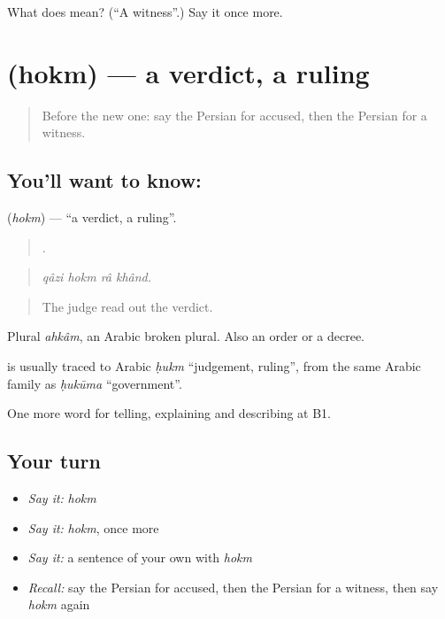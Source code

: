\begin{tcolorbox}[breakable,colback=teal!4,colframe=teal!35!black,title={Before you move on}]
What does  mean? (\textquotedblleft{}A witness\textquotedblright{}.) Say it once more.
\end{tcolorbox}
\section[\texorpdfstring{\fa{حکم} (hokm)}{حکم (hokm)}]{ (hokm) — a verdict, a ruling}

\label{lesson:FA-C406-hokm}



\begin{quote}
Before the new one: say the Persian for accused, then the Persian for a witness.
\end{quote}

\subsection*{You'll want to know: }
\textbf{} (\emph{hokm}) — \textquotedblleft{}a verdict, a ruling\textquotedblright{}.

\begin{quote}
   .
\end{quote}

\begin{quote}
\emph{qâzi hokm râ khând.}
\end{quote}

\begin{quote}
The judge read out the verdict.
\end{quote}

Plural \emph{ahkâm}, an Arabic broken plural. Also an order or a decree.

\begin{cousinweb}
\textbf{} is usually traced to Arabic \emph{ḥukm} \textquotedblleft{}judgement, ruling\textquotedblright{}, from the same Arabic family as \emph{ḥukūma} \textquotedblleft{}government\textquotedblright{}.
\end{cousinweb}

\begin{grammarlens}[title={What you've built}]
One more word for telling, explaining and describing at B1.
\end{grammarlens}

\subsection*{Your turn}
\begin{itemize}
\raggedright
  \item \emph{Say it:} \emph{hokm}
  \item \emph{Say it:} \emph{hokm}, once more
  \item \emph{Say it:} a sentence of your own with \emph{hokm}
  \item \emph{Recall:} say the Persian for accused, then the Persian for a witness, then say \emph{hokm} again
\end{itemize}

